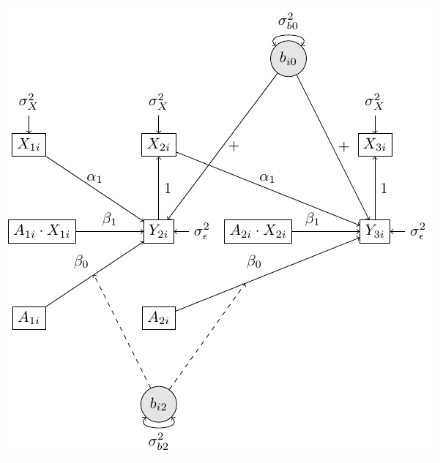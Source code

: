 \documentclass[
  11pt,
  a4paper,
]{article}
\begin{document}
\begin{figure}[H]
\begin{minipage}{0.50\linewidth}
{\includegraphics[width=1\textwidth,height=\textheight]{research-report_files/figure-pdf/fig-GMA_path-1.pdf}

}

\end{minipage}%
\newline
\begin{minipage}{0.50\linewidth}


\end{minipage}
\end{figure}
\end{document}
